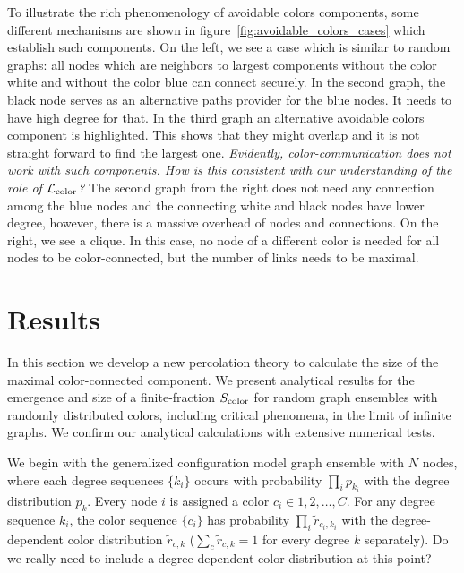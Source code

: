 \documentclass[aps, pre, twocolumn, a4paper, superscriptaddress, floatfix]{revtex4}
\newcommand{\red}{\color{red}\footnotesize}
\begin{document}
%
To illustrate the rich phenomenology of avoidable colors components,  
some different mechanisms are shown in figure~\ref{fig:avoidable_colors_cases} 
which establish such components.
On the left, we see a case which is similar to  random graphs: 
all nodes which are neighbors to largest components without 
the color white and without the color blue can connect securely. 
{\red
In the second graph, the black node serves as an alternative paths provider for the blue nodes. 
It needs to have high degree for that. 
In the third graph an alternative avoidable colors component is highlighted. 
This shows that they might overlap and it is not straight forward to find the largest 
one. \textit{Evidently, color-communication does not work with such components.  How is this consistent with our understanding of the role of $\mathcal{L}_{\rm color}$?}}
The second graph from the right does not need any connection among the blue nodes 
and the connecting white and black nodes have lower degree, 
however, there is a massive overhead of nodes and connections. 
On the right, we see a clique. In this case, no node 
of a different color is needed for all nodes to be color-connected, but the number of links needs to be maximal.




\section{Results}
In this section we develop a new percolation theory to calculate the size of the maximal color-connected component.
We present analytical results for the emergence and size of a finite-fraction  $S_{\rm color}$  
for random graph ensembles with randomly distributed colors, including critical phenomena, in the limit of infinite graphs.
We confirm our analytical calculations with extensive numerical tests.

We begin with the generalized configuration model graph ensemble with $N$ nodes, 
where each degree sequences $\{k_i\}$ occurs with probability 
$\prod_i p_{k_i}$ with the degree distribution $p_{k}$. 
Every node $i$ is assigned a color $c_i\in 1,2,\dots,C$. 
For any degree sequence $k_i$, the color sequence $\{c_i\}$ has probability $\prod_i {\tilde r}_{c_i,k_i}$ 
with the degree-dependent color distribution ${\tilde r}_{c,k}$ ($\sum_c {\tilde r}_{c,k}=1$ 
for every degree $k$ separately). 
{\red Do we really need to include a degree-dependent color distribution at this point?}
\end{document}
